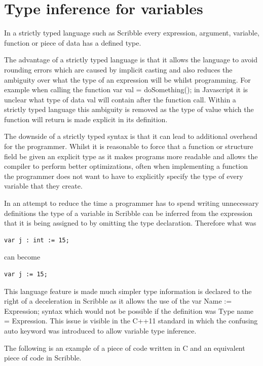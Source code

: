 \documentclass[]{final_report}
\begin{document}
\section{Type inference for variables}

In a strictly typed language such as Scribble every expression, argument, variable, function or piece of data has a defined type.

The advantage of a strictly typed language is that it allows the language to avoid rounding errors which are caused by implicit casting and also reduces the ambiguity over what the type of an expression will be whilst programming. For example when calling the function var val = doSomething(); in Javascript it is unclear what type of data val will contain after the function call. Within a strictly typed language this ambiguity is removed as the type of value which the function will return is made explicit in its definition.

The downside of a strictly typed syntax is that it can lead to additional overhead for the programmer. Whilst it is reasonable to force that a function or structure field be given an explicit type as it makes programs more readable and allows the compiler to perform better optimizations, often when implementing a function the programmer does not want to have to explicitly specify the type of every variable that they create.

In an attempt to reduce the time a programmer has to spend writing unnecessary definitions the type of a variable in Scribble can be inferred from the expression that it is being assigned to by omitting the type declaration. Therefore what was 

\begin{verbatim}
var j : int := 15;
\end{verbatim}
can become \begin{verbatim}
var j := 15;
\end{verbatim}

This language feature is made much simpler type information is declared to the right of a deceleration in Scribble as it allows the use of the var Name := Expression; syntax which would not be possible if the definition was Type name = Expression. This issue is visible in the C++11 standard in which the confusing auto keyword was introduced to allow variable type inference.

The following is an example of a piece of code written in C and an equivalent piece of code in Scribble.
\end{document}
